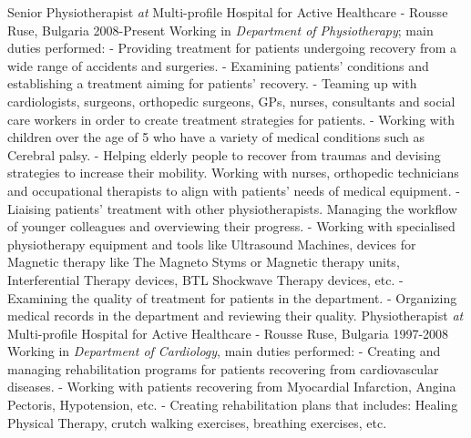 

\cventry
{Senior Physiotherapist \textit{at}  Multi-profile Hospital for Active Healthcare - Rousse}
{Ruse, Bulgaria 2008-Present}
{
Working in \textit{Department of Physiotherapy}; main duties performed: 
\newline
\hspace{3ex} - Providing treatment for patients undergoing recovery from a wide range of accidents and surgeries.
\newline
\hspace{3ex} - Examining patients' conditions and establishing a treatment aiming for patients' recovery. 
\newline
\hspace{3ex} - Teaming up with cardiologists, surgeons, orthopedic surgeons, GPs, nurses, consultants and social care workers in order to create treatment strategies for patients. 
\newline
\hspace{3ex} - Working with children over the age of 5 who have a variety of medical conditions such as Cerebral palsy.
\newline
\hspace{3ex} - Helping elderly people to recover from traumas and devising strategies to increase their mobility. Working with nurses, orthopedic technicians and occupational therapists to align with patients' needs of medical equipment. 
\newline
\hspace{3ex} - Liaising patients' treatment with other physiotherapists. Managing the workflow of younger colleagues and overviewing their progress. 
\newline
\hspace{3ex} - Working with specialised physiotherapy equipment and tools like Ultrasound Machines, devices for Magnetic therapy like The Magneto Styms or Magnetic therapy units, Interferential Therapy devices, BTL Shockwave Therapy devices, etc.
\newline
\hspace{3ex} - Examining the quality of treatment for patients in the department.
\newline
\hspace{3ex} - Organizing medical records in the department and reviewing their quality.   
}
\vspace{+3mm}
\cventry
{Physiotherapist \textit{at}  Multi-profile Hospital for Active Healthcare - Rousse}
{Ruse, Bulgaria 1997-2008}
{
Working in \textit{Department of Cardiology}, main duties performed: 
\newline
\hspace{3ex} - Creating and managing rehabilitation programs for patients recovering from cardiovascular diseases.
\newline
\hspace{3ex} - Working with patients recovering from Myocardial Infarction, Angina Pectoris, Hypotension, etc.
\newline
\hspace{3ex} - Creating rehabilitation plans that includes: Healing Physical Therapy, crutch walking exercises, breathing exercises, etc.
}
